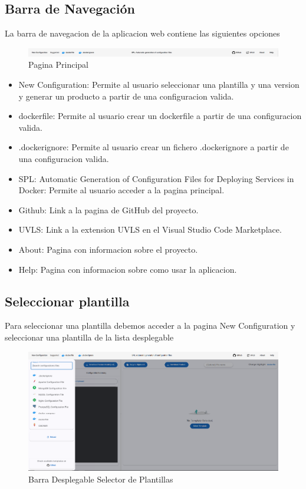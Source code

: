 \documentclass[12pt, a4paper, twoside]{article}
\begin{document}
\begin{umaappendices}
	\subsection{Barra de Navegación}
	La barra de navegacion de la aplicacion web contiene las siguientes opciones
	\begin{figure}[ht]
		\centering
			\includegraphics[width=1\textwidth]{navpage.png}
		\caption{Pagina Principal}
	\end{figure}
	\begin{itemize}
		\item 	New Configuration: Permite al usuario seleccionar una plantilla y una version y generar un producto a partir de una configuracion valida.
		\item 	dockerfile: Permite al usuario crear un dockerfile a partir de una configuracion valida.
		\item 	.dockerignore: Permite al usuario crear un fichero .dockerignore a partir de una configuracion valida.
		\item 	SPL: Automatic Generation of Configuration Files for Deploying Services in Docker: Permite al usuario acceder a la pagina principal.
		\item 	Github: Link a la pagina de GitHub del proyecto.
		\item 	UVLS: Link a la extension UVLS en el Visual Studio Code Marketplace.
		\item 	About: Pagina con informacion sobre el proyecto.
		\item 	Help: Pagina con informacion sobre como usar la aplicacion.
	
	\end{itemize}

	

	\subsection{Seleccionar plantilla}
	Para seleccionar una plantilla debemos acceder a la pagina New Configuration y seleccionar una plantilla de la lista desplegable

	\begin{figure}[h]
		\centering
			\includegraphics[width=1\textwidth]{selectTemplatePage.png}
		\caption{Barra Desplegable Selector de Plantillas}
	\end{figure}
	\newpage

\end{umaappendices}
\end{document}
